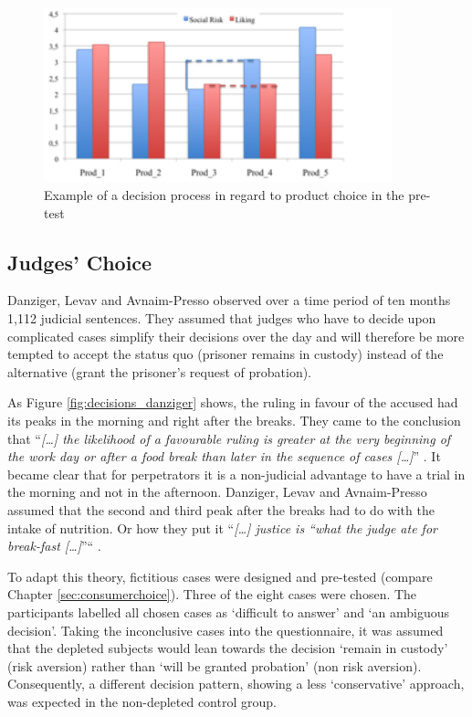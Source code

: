 \begin{figure}[h!]
\center
	\includegraphics[width=0.9\textwidth]{images/pretest_sample.png}
  \caption{Example of a decision process in regard to product choice in the pre-test}\label{fig:decision_process}
\end{figure}

\subsection{Judges’ Choice}
Danziger, Levav and Avnaim-Presso \citep{danziger2011extraneous} observed over a time period of ten months 1,112 judicial sentences. They assumed that judges who have to decide upon complicated cases simplify their decisions over the day and will therefore be more tempted to accept the status quo (prisoner remains in custody) instead of the alternative (grant the prisoner’s request of probation).\par
As Figure \ref{fig:decisions_danziger} shows, the ruling in favour of the accused had its peaks in the morning and right after the breaks. They came to the conclusion that “\emph{[\ldots] the likelihood of a favourable ruling is greater at the very beginning of the work day or after a food break than later in the sequence of cases [\ldots]}” \citep[p.~6890]{danziger2011extraneous}. It became clear that for perpetrators it is a non-judicial advantage to have a trial in the morning and not in the afternoon. Danziger, Levav and Avnaim-Presso assumed that the second and third peak after the breaks had to do with the intake of nutrition. Or how they put it “\emph{[\ldots] justice is “what the judge ate for break-fast [\ldots]}”“ \cite[p.~6889]{danziger2011extraneous}. \par
To adapt this theory, fictitious cases were designed and pre-tested (compare Chapter \ref{sec:consumerchoice}). Three of the eight cases were chosen. The participants labelled all chosen cases as ‘difficult to answer’ and ‘an ambiguous decision’. Taking the inconclusive cases into the questionnaire, it was assumed that the depleted subjects would lean towards the decision ‘remain in custody’ (risk aversion) rather than ‘will be granted probation’ (non risk aversion). Consequently, a different decision pattern, showing a less ‘conservative’ approach, was expected in the non-depleted control group.\par

